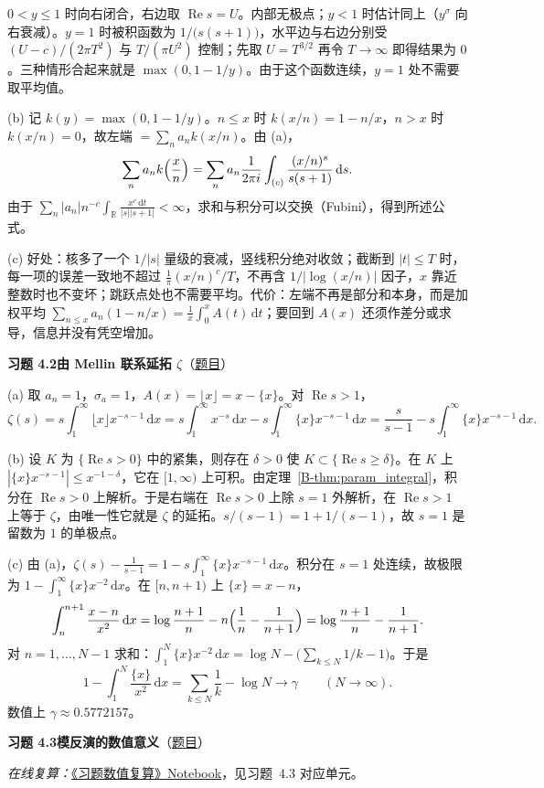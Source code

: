 \documentclass[11pt,a4paper]{article}
\newcommand{\RR}{\mathbb{R}}
\newcommand{\dd}{\,\mathrm{d}}
\renewcommand{\Re}{\operatorname{Re}}
\newcommand{\bref}[1]{\ref*{B-#1}}
\newcommand{\Sol}[2]{%
  \par\addvspace{1.2em}\noindent
  \hypertarget{s:#1}{}\textbf{习题 #1\quad #2}\hfill{\small（\hyperlink{q:#1}{题目}）}\par
  \nopagebreak\smallskip}
\begin{document}
$0<y\le1$ 时向右闭合，右边取 $\Re s=U$。内部无极点；$y<1$ 时估计同上（$y^\sigma$ 向右衰减）。$y=1$ 时被积函数为 $1/\bigl(s(s+1)\bigr)$，水平边与右边分别受 $(U-c)/(2\pi T^2)$ 与 $T/(\pi U^2)$ 控制；先取 $U=T^{3/2}$ 再令 $T\to\infty$ 即得结果为 $0$。三种情形合起来就是 $\max(0,1-1/y)$。由于这个函数连续，$y=1$ 处不需要取平均值。

(b) 记 $k(y)=\max(0,1-1/y)$。$n\le x$ 时 $k(x/n)=1-n/x$，$n>x$ 时 $k(x/n)=0$，故左端 $=\sum_na_nk(x/n)$。由 (a)，
\[
  \sum_na_nk\Bigl(\frac xn\Bigr)=\sum_na_n\frac1{2\pi i}\int_{(c)}\frac{(x/n)^s}{s(s+1)}\dd s .
\]
由于 $\sum_n|a_n|n^{-c}\int_{\RR}\frac{x^c\dd t}{|s||s+1|}<\infty$，求和与积分可以交换（Fubini），得到所述公式。

(c) 好处：核多了一个 $1/|s|$ 量级的衰减，竖线积分绝对收敛；截断到 $|t|\le T$ 时，每一项的误差一致地不超过 $\frac1\pi(x/n)^c/T$，不再含 $1/|\log(x/n)|$ 因子，$x$ 靠近整数时也不变坏；跳跃点处也不需要平均。代价：左端不再是部分和本身，而是加权平均 $\sum_{n\le x}a_n(1-n/x)=\frac1x\int_0^xA(t)\dd t$；要回到 $A(x)$ 还须作差分或求导，信息并没有凭空增加。

\Sol{4.2}{由 Mellin 联系延拓 $\zeta$}
(a) 取 $a_n=1$，$\sigma_a=1$，$A(x)=\lfloor x\rfloor=x-\{x\}$。对 $\Re s>1$，
\[
  \zeta(s)=s\int_1^\infty\lfloor x\rfloor x^{-s-1}\dd x=s\int_1^\infty x^{-s}\dd x-s\int_1^\infty\{x\}x^{-s-1}\dd x=\frac{s}{s-1}-s\int_1^\infty\{x\}x^{-s-1}\dd x .
\]

(b) 设 $K$ 为 $\{\Re s>0\}$ 中的紧集，则存在 $\delta>0$ 使 $K\subset\{\Re s\ge\delta\}$。在 $K$ 上 $|\{x\}x^{-s-1}|\le x^{-1-\delta}$，它在 $[1,\infty)$ 上可积。由定理~\bref{thm:param_integral}，积分在 $\Re s>0$ 上解析。于是右端在 $\Re s>0$ 上除 $s=1$ 外解析，在 $\Re s>1$ 上等于 $\zeta$，由唯一性它就是 $\zeta$ 的延拓。$s/(s-1)=1+1/(s-1)$，故 $s=1$ 是留数为 $1$ 的单极点。

(c) 由 (a)，$\zeta(s)-\frac1{s-1}=1-s\int_1^\infty\{x\}x^{-s-1}\dd x$。积分在 $s=1$ 处连续，故极限为 $1-\int_1^\infty\{x\}x^{-2}\dd x$。在 $[n,n+1)$ 上 $\{x\}=x-n$，
\[
  \int_n^{n+1}\frac{x-n}{x^2}\dd x=\log\frac{n+1}n-n\Bigl(\frac1n-\frac1{n+1}\Bigr)=\log\frac{n+1}n-\frac1{n+1}.
\]
对 $n=1,\dots,N-1$ 求和：$\int_1^N\{x\}x^{-2}\dd x=\log N-\bigl(\sum_{k\le N}1/k-1\bigr)$。于是
\[
  1-\int_1^N\frac{\{x\}}{x^2}\dd x=\sum_{k\le N}\frac1k-\log N\longrightarrow\gamma\qquad(N\to\infty).
\]
数值上 $\gamma\approx0.5772157$。

\Sol{4.3}{模反演的数值意义}
\emph{在线复算：}\href{https://colab.research.google.com/github/lichengtong123/lichengtong-RH/blob/main/\%E4\%B9\%A0\%E9\%A2\%98\%E4\%B8\%8E\%E8\%A7\%A3\%E7\%AD\%94/\%E4\%B9\%A0\%E9\%A2\%98\%E6\%95\%B0\%E5\%80\%BC\%E5\%A4\%8D\%E7\%AE\%97.ipynb}{《习题数值复算》Notebook}，见习题~4.3 对应单元。
\end{document}
